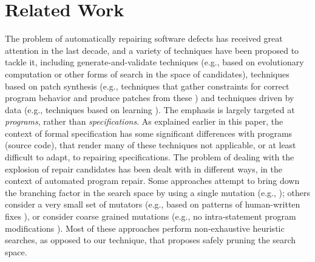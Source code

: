 \section{Related Work}

The problem of automatically repairing software defects has received great attention in the last decade, and a variety of techniques have been proposed to tackle it, including generate-and-validate techniques (e.g., based on evolutionary computation \cite{LeGoues+2012} or other forms of search in the space of candidates), techniques based on patch synthesis (e.g., techniques that gather constraints for correct program behavior and produce patches from these \cite{Mechtaev+2016}) and techniques driven by data (e.g., techniques based on learning \cite{LongRinard2016}). The emphasis is largely targeted at \emph{programs}, rather than \emph{specifications}. As explained earlier in this paper, the context of formal specification has some significant differences with programs (source code), that render many of these techniques not applicable, or at least difficult to adapt, to repairing specifications. The problem of dealing with the explosion of repair candidates has been dealt with in different ways, in the context of automated program repair. Some approaches attempt to bring down the branching factor in the search space by using a single mutation (e.g., \cite{DBLP:conf/tacas/GopinathMK11}); others consider a very small set of mutators (e.g., based on patterns of human-written fixes \cite{Kim+2013}), or consider coarse grained mutations (e.g., no intra-statement program modifications \cite{LeGoues+2012}). Most of these approaches perform non-exhaustive heuristic searches, as opposed to our technique, that proposes safely pruning the search space.

